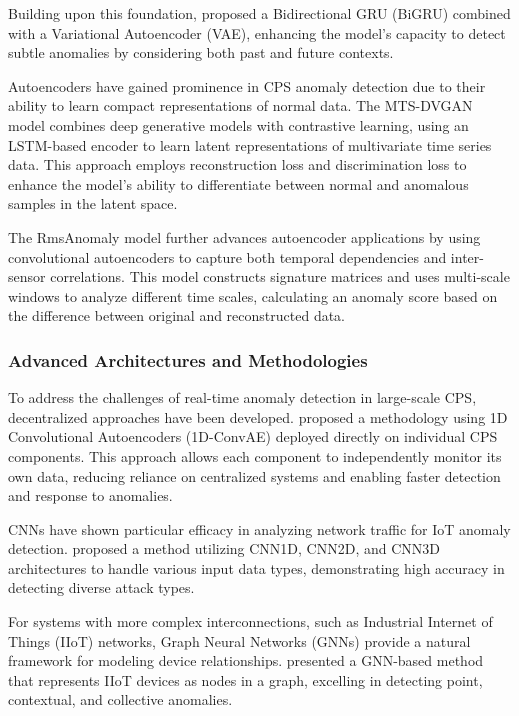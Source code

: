 Building upon this foundation, \cite{57} proposed a Bidirectional GRU (BiGRU) combined with a Variational Autoencoder (VAE), enhancing the model's capacity to detect subtle anomalies by considering both past and future contexts.

Autoencoders have gained prominence in CPS anomaly detection due to their ability to learn compact representations of normal data. The MTS-DVGAN model \cite{87} combines deep generative models with contrastive learning, using an LSTM-based encoder to learn latent representations of multivariate time series data. This approach employs reconstruction loss and discrimination loss to enhance the model's ability to differentiate between normal and anomalous samples in the latent space.

The RmsAnomaly model \cite{46} further advances autoencoder applications by using convolutional autoencoders to capture both temporal dependencies and inter-sensor correlations. This model constructs signature matrices and uses multi-scale windows to analyze different time scales, calculating an anomaly score based on the difference between original and reconstructed data.

\subsubsection{Advanced Architectures and Methodologies}

To address the challenges of real-time anomaly detection in large-scale CPS, decentralized approaches have been developed. \cite{50} proposed a methodology using 1D Convolutional Autoencoders (1D-ConvAE) deployed directly on individual CPS components. This approach allows each component to independently monitor its own data, reducing reliance on centralized systems and enabling faster detection and response to anomalies.

CNNs have shown particular efficacy in analyzing network traffic for IoT anomaly detection. \cite{81} proposed a method utilizing CNN1D, CNN2D, and CNN3D architectures to handle various input data types, demonstrating high accuracy in detecting diverse attack types.

For systems with more complex interconnections, such as Industrial Internet of Things (IIoT) networks, Graph Neural Networks (GNNs) provide a natural framework for modeling device relationships.  \cite{73} presented a GNN-based method that represents IIoT devices as nodes in a graph, excelling in detecting point, contextual, and collective anomalies.


